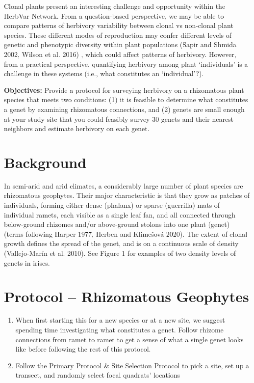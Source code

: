 \documentclass[
  letterpaper,
  DIV=11,
  numbers=noendperiod]{scrreprt}
\begin{document}
Clonal plants present an interesting challenge and opportunity within
the HerbVar Network. From a question-based perspective, we may be able
to compare patterns of herbivory variability between clonal vs
non-clonal plant species. These different modes of reproduction may
confer different levels of genetic and phenotypic diversity within plant
populations (Sapir and Shmida 2002, Wilson et al. 2016) , which could
affect patterns of herbivory. However, from a practical perspective,
quantifying herbivory among plant `individuals' is a challenge in these
systems (i.e., what constitutes an `individual'?).

\textbf{Objectives:} Provide a protocol for surveying herbivory on a
rhizomatous plant species that meets two conditions: (1) it is feasible
to determine what constitutes a genet by examining rhizomatous
connections, and (2) genets are small enough at your study site that you
could feasibly survey 30 genets and their nearest neighbors and estimate
herbivory on each genet.

\section{Background}\label{background}

In semi-arid and arid climates, a considerably large number of plant
species are rhizomatous geophytes. Their major characteristic is that
they grow as patches of individuals, forming either dense (phalanx) or
sparse (guerrilla) mats of individual ramets, each visible as a single
leaf fan, and all connected through below-ground rhizomes and/or
above-ground stolons into one plant (genet) (terms following Harper
1977, Herben and Klimešová 2020). The extent of clonal growth defines
the spread of the genet, and is on a continuous scale of density
(Vallejo-Marín et al. 2010). See Figure 1 for examples of two density
levels of genets in irises.

\section{Protocol -- Rhizomatous
Geophytes}\label{protocol-rhizomatous-geophytes}

\begin{enumerate}
\def\labelenumi{\arabic{enumi}.}
\item
  When first starting this for a new species or at a new site, we
  suggest spending time investigating what constitutes a genet. Follow
  rhizome connections from ramet to ramet to get a sense of what a
  single genet looks like before following the rest of this protocol.
\item
  Follow the Primary Protocol \& Site Selection Protocol to pick a site,
  set up a transect, and randomly select focal quadrats' locations
\end{enumerate}
\end{document}
